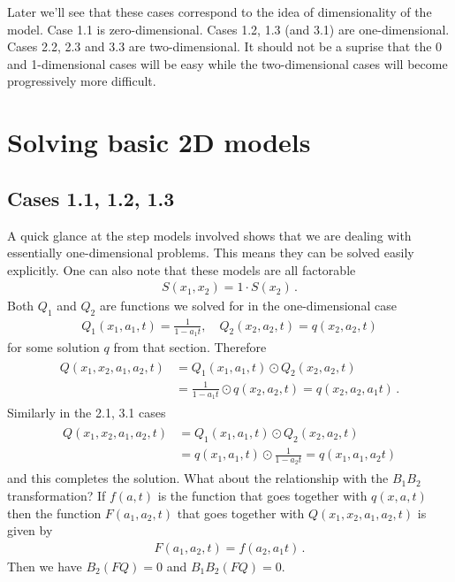  Later we'll see that these cases correspond to the idea of dimensionality of the model. Case 1.1 is zero-dimensional. Cases 1.2, 1.3 (and 3.1) are one-dimensional. Cases 2.2, 2.3 and 3.3 are two-dimensional. It should not be a suprise that the 0 and 1-dimensional cases will be easy while the two-dimensional cases will become progressively more difficult.
 
\section{Solving basic 2D models}

\subsection{Cases 1.1, 1.2, 1.3}
A quick glance at the step models involved shows that we are dealing with essentially one-dimensional problems. This means they can be solved easily explicitly. One can also note that these models are all factorable
\begin{align}
	S(x_1,x_2) = 1\cdot S(x_2)\,.
\end{align}
Both $Q_1$ and $Q_2$ are functions we solved for in the one-dimensional case
\begin{align}
	Q_1(x_1,a_1,t) = \frac{1}{1-a_1 t},\quad Q_2(x_2,a_2,t) = q(x_2,a_2,t)
\end{align}
for some solution $q$ from that section. Therefore
\begin{align}\begin{split}
	Q(x_1,x_2,a_1,a_2,t) &= Q_1(x_1,a_1,t) \odot Q_2(x_2,a_2,t) \\
	&= \frac{1}{1-a_1 t}\odot q(x_2,a_2,t) = q(x_2,a_2,a_1 t)\,.
\end{split}\end{align}
Similarly in the 2.1, 3.1 cases
\begin{align}\begin{split}
	Q(x_1,x_2,a_1,a_2,t) &= Q_1(x_1,a_1,t) \odot Q_2(x_2,a_2,t) \\
	& =  q(x_1,a_1,t) \odot \frac{1}{1-a_2 t}= q(x_1,a_1,a_2 t)
\end{split}\end{align}
and this completes the solution. What about the relationship with the $B_1B_2$ transformation? If $f(a,t)$ is the function that goes together with $q(x,a,t)$ then the function $F(a_1,a_2,t)$ that goes together with $Q(x_1,x_2,a_1,a_2,t)$ is given by
\begin{align}
	F(a_1,a_2,t) = f(a_2,a_1 t)\,.
\end{align}
Then we have $B_2 (FQ) = 0$ and $B_1B_2(FQ) = 0$.

